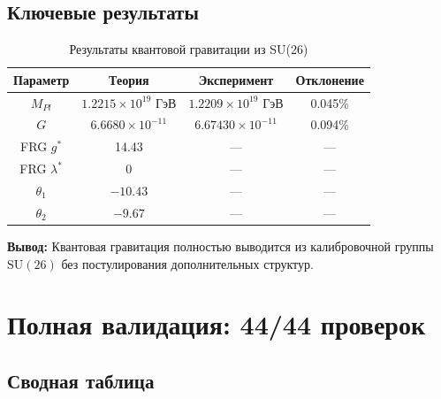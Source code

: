 \documentclass[12pt,a4paper,twoside]{article}
\newcommand{\SU}{\mathrm{SU}}
\theoremstyle{definition}
\begin{document}
\subsection{Ключевые результаты}

\begin{table}[H]
\centering
\small
\caption{Результаты квантовой гравитации из SU(26)}
\label{tab:quantum_gravity_results}
\begin{tabular}{c|c|c|c}
\toprule
\textbf{Параметр} & \textbf{Теория} & \textbf{Эксперимент} & \textbf{Отклонение} \\
\midrule
$M_{Pl}$ & $1.2215 \times 10^{19}$ ГэВ & $1.2209 \times 10^{19}$ ГэВ & 0.045\% \\
$G$ & $6.6680 \times 10^{-11}$ & $6.67430 \times 10^{-11}$ & 0.094\% \\
FRG $g^*$ & 14.43 & — & — \\
FRG $\lambda^*$ & 0 & — & — \\
$\theta_1$ & $-10.43$ & — & — \\
$\theta_2$ & $-9.67$ & — & — \\
\bottomrule
\end{tabular}
\end{table}

\textbf{Вывод:} Квантовая гравитация полностью выводится из калибровочной группы $\SU(26)$ без постулирования дополнительных структур.

\section{Полная валидация: 44/44 проверок}
\label{sec:validation}

\subsection{Сводная таблица}
\end{document}
